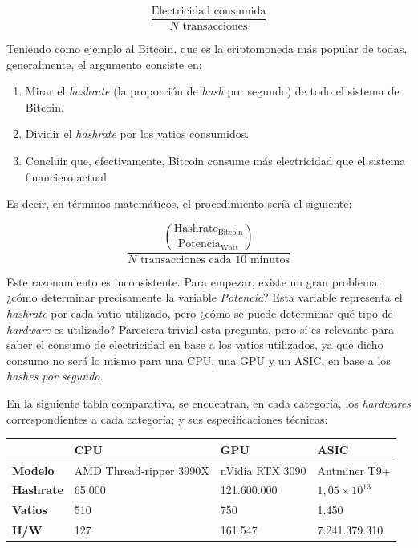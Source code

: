 \documentclass[12pt,a4paper,twoside]{book}
\begin{document}
\[
\dfrac{\text{Electricidad consumida}}{N \text{ transacciones}}
\]

Teniendo como ejemplo al Bitcoin, que es la criptomoneda más popular de todas, generalmente, el argumento consiste en: 

\begin{enumerate}
\item Mirar el \textit{hashrate} (la proporción de \textit{hash} por segundo) de todo el sistema de Bitcoin.
\item Dividir el \textit{hashrate} por los vatios consumidos.
\item Concluir que, efectivamente, Bitcoin consume más electricidad que el sistema financiero actual.
\end{enumerate}

Es decir, en términos matemáticos, el procedimiento sería el siguiente:

\[
\dfrac{\left( \dfrac{\text{Hashrate}_{\text{Bitcoin}}}{\text{Potencia}_\text{Watt}} \right)}{N \text{ transacciones cada 10 minutos}}
\]

Este razonamiento es inconsistente. Para empezar, existe un gran problema: ¿cómo determinar precisamente la variable \textit{Potencia}? Esta variable representa el \textit{hashrate} por cada vatio utilizado, pero ¿cómo se puede determinar qué tipo de \textit{hardware} es utilizado? Pareciera trivial esta pregunta, pero sí es relevante para saber el consumo de electricidad en base a los vatios utilizados, ya que dicho consumo no será lo mismo para una CPU, una GPU y un ASIC, en base a los \textit{hashes por segundo}.

En la siguiente tabla comparativa, se encuentran, en cada categoría, los \textit{hardwares} correspondientes a cada categoría; y sus especificaciones técnicas:

\vspace{0.25cm}

\begin{tabular}{|l|p{3cm}|p{3cm}|p{3cm}|}
\hline 
 & \textbf{CPU} & \textbf{GPU} & \textbf{ASIC} \\ 
\hline 
\textbf{Modelo} & AMD Thread-ripper 3990X & nVidia RTX 3090 & Antminer T9+ \\ 
\hline 
\textbf{Hashrate} & 65.000 & 121.600.000 & $ 1,05 \times 10^{13} $ \\ 
\hline 
\textbf{Vatios} & 510 & 750 & 1.450 \\ 
\hline 
\textbf{H/W} & 127 & 161.547 & 7.241.379.310 \\ 
\hline 
\end{tabular}
\end{document}
